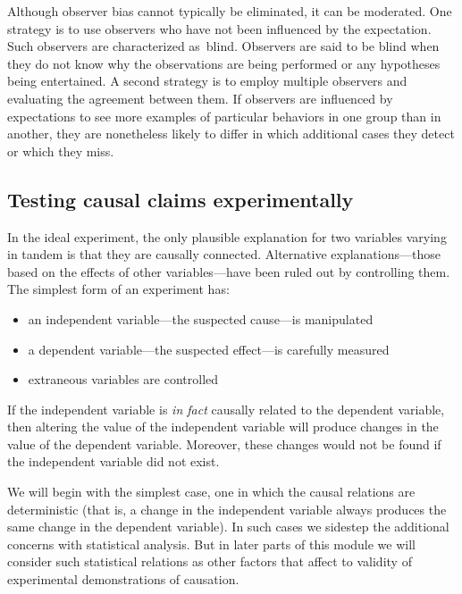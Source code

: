 \begin{refsection}
Although observer bias cannot typically be eliminated, it can be moderated. One strategy is to use observers who have not been influenced by the expectation. Such observers are characterized as blind. Observers are said to be blind when they do not know why the observations are being performed or any hypotheses being entertained. A second strategy is to employ multiple observers and evaluating the agreement between them. If observers are influenced by expectations to see more examples of particular behaviors in one group than in another, they are nonetheless likely to differ in which additional cases they detect or which they miss.

\subsection{Testing causal claims experimentally}
\label{testingcausalclaimsexperimentally}

In the ideal experiment, the only plausible explanation for two variables varying in tandem is that they are causally connected. Alternative explanations---those based on the effects of other variables---have been ruled out by controlling them. The simplest form of an experiment has:

\begin{itemize}
\item an independent variable---the suspected cause---is manipulated

\item a dependent variable---the suspected effect---is carefully measured

\item extraneous variables are controlled

\end{itemize}

If the independent variable is \emph{in fact} causally related to the dependent variable, then altering the value of the independent variable will produce changes in the value of the dependent variable. Moreover, these changes would not be found if the independent variable did not exist.

We will begin with the simplest case, one in which the causal relations are deterministic (that is, a change in the independent variable always produces the same change in the dependent variable). In such cases we sidestep the additional concerns with statistical analysis. But in later parts of this module we will consider such statistical relations as other factors that affect to validity of experimental demonstrations of causation.


\end{refsection}
